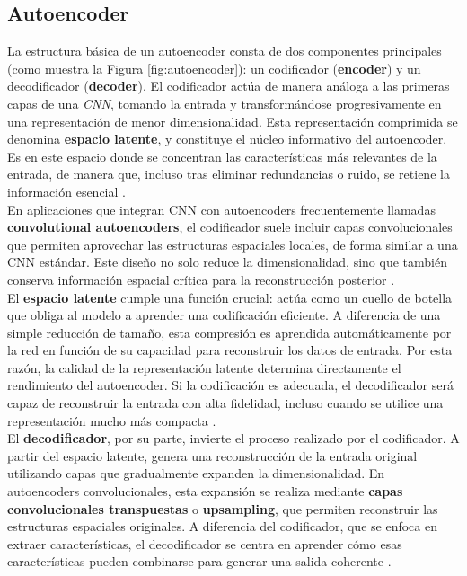 \documentclass[12pt]{article} %
\begin{document}
\subsection{Autoencoder}
La estructura básica de un autoencoder consta de dos componentes principales (como muestra la Figura \ref{fig:autoencoder}): un codificador (\textbf{encoder}) y un decodificador (\textbf{decoder}). El codificador actúa de manera análoga a las primeras capas de una \textit{CNN}, tomando la entrada y transformándose progresivamente en una representación de menor dimensionalidad. Esta representación comprimida se denomina \textbf{espacio latente}, y constituye el núcleo informativo del autoencoder. Es en este espacio donde se concentran las características más relevantes de la entrada, de manera que, incluso tras eliminar redundancias o ruido, se retiene la información esencial \cite{bank2023autoencoders}. \\

En aplicaciones que integran CNN con autoencoders frecuentemente llamadas \textbf{convolutional autoencoders}, el codificador suele incluir capas convolucionales que permiten aprovechar las estructuras espaciales locales, de forma similar a una CNN estándar. Este diseño no solo reduce la dimensionalidad, sino que también conserva información espacial crítica para la reconstrucción posterior \cite{masci2011stacked}. \\

El \textbf{espacio latente} cumple una función crucial: actúa como un cuello de botella que obliga al modelo a aprender una codificación eficiente. A diferencia de una simple reducción de tamaño, esta compresión es aprendida automáticamente por la red en función de su capacidad para reconstruir los datos de entrada. Por esta razón, la calidad de la representación latente determina directamente el rendimiento del autoencoder. Si la codificación es adecuada, el decodificador será capaz de reconstruir la entrada con alta fidelidad, incluso cuando se utilice una representación mucho más compacta \cite{hinton2006reducing,goodfellow2016deep}. \\

El \textbf{decodificador}, por su parte, invierte el proceso realizado por el codificador. A partir del espacio latente, genera una reconstrucción de la entrada original utilizando capas que gradualmente expanden la dimensionalidad. En autoencoders convolucionales, esta expansión se realiza mediante \textbf{capas convolucionales transpuestas} o \textbf{upsampling}, que permiten reconstruir las estructuras espaciales originales. A diferencia del codificador, que se enfoca en extraer características, el decodificador se centra en aprender cómo esas características pueden combinarse para generar una salida coherente \cite{masci2011stacked}. \\
\end{document}
